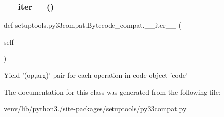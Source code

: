\subsubsection{\texorpdfstring{\+\_\+\+\_\+iter\+\_\+\+\_\+()}{\_\_iter\_\_()}}
{\footnotesize\ttfamily def setuptools.\+py33compat.\+Bytecode\+\_\+compat.\+\_\+\+\_\+iter\+\_\+\+\_\+ (\begin{DoxyParamCaption}\item[{}]{self }\end{DoxyParamCaption})}

\begin{DoxyVerb}Yield '(op,arg)' pair for each operation in code object 'code'\end{DoxyVerb}
 

The documentation for this class was generated from the following file\+:\begin{DoxyCompactItemize}
\item 
venv/lib/python3./site-\/packages/setuptools/py33compat.\+py\end{DoxyCompactItemize}
